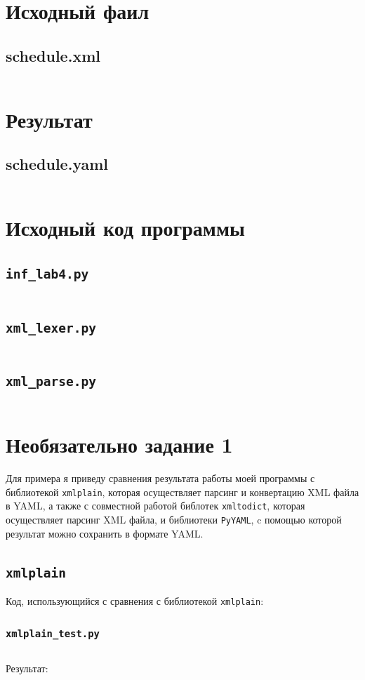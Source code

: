 \documentclass[11pt]{article}
\begin{document}
\section{Исходный фаил}
\subsection{schedule.xml}
\inputminted{xml}{../schedule.xml}
\pagebreak
\section{Результат}
\subsection{schedule.yaml}
\inputminted{yaml}{../schedule.yaml}
\pagebreak{}
\section{Исходный код программы}
\subsection{\texttt{inf\_lab4.py}}
\inputminted{python}{../inf_lab4.py}
\subsection{\texttt{xml\_lexer.py}}
\inputminted{python}{../xml_lexer.py}
\subsection{\texttt{xml\_parse.py}}
\inputminted{python}{../xml_parser.py}
\section{Необязательно задание 1}
Для примера я приведу сравнения результата работы моей программы с библиотекой \texttt{xmlplain}, которая осуществляет парсинг и конвертацию XML файла в YAML, а также с совместной работой библотек \texttt{xmltodict}, которая осуществляет парсинг XML файла, и библиотеки \texttt{PyYAML}, c помощью которой результат можно сохранить в формате YAML.
\subsection{\texttt{xmlplain}}
Код, использующийся с сравнения с библиотекой \texttt{xmlplain}:
\subsubsection{\texttt{xmlplain\_test.py}}
\inputminted{python}{../xmlplain_test.py}
Результат:
\end{document}
